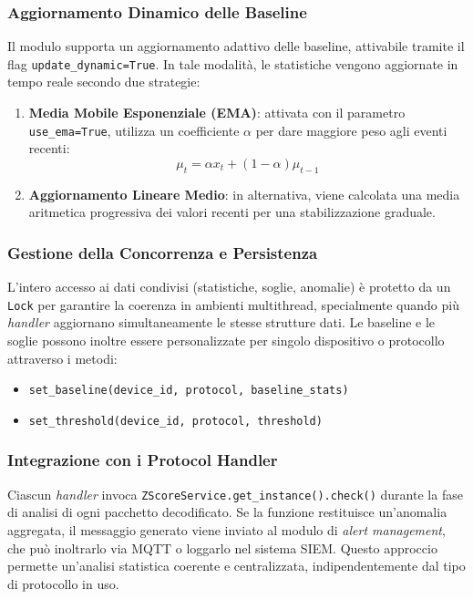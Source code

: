 \begin{enumerate}
\subsubsection{Aggiornamento Dinamico delle Baseline}
Il modulo supporta un aggiornamento adattivo delle baseline, attivabile tramite il flag \texttt{update\_dynamic=True}.  
In tale modalità, le statistiche vengono aggiornate in tempo reale secondo due strategie:
\begin{enumerate}
  \item \textbf{Media Mobile Esponenziale (EMA)}: attivata con il parametro \texttt{use\_ema=True}, utilizza un coefficiente \(\alpha\) per dare maggiore peso agli eventi recenti:
  \[
  \mu_{t} = \alpha x_{t} + (1 - \alpha) \mu_{t-1}
  \]
  \item \textbf{Aggiornamento Lineare Medio}: in alternativa, viene calcolata una media aritmetica progressiva dei valori recenti per una stabilizzazione graduale.
\end{enumerate}

\subsubsection{Gestione della Concorrenza e Persistenza}
L’intero accesso ai dati condivisi (statistiche, soglie, anomalie) è protetto da un \texttt{Lock} per garantire la coerenza in ambienti multithread, specialmente quando più \textit{handler} aggiornano simultaneamente le stesse strutture dati.  
Le baseline e le soglie possono inoltre essere personalizzate per singolo dispositivo o protocollo attraverso i metodi:
\begin{itemize}
  \item \texttt{set\_baseline(device\_id, protocol, baseline\_stats)}
  \item \texttt{set\_threshold(device\_id, protocol, threshold)}
\end{itemize}

\subsubsection{Integrazione con i Protocol Handler}
Ciascun \textit{handler} invoca \texttt{ZScoreService.get\_instance().check()} durante la fase di analisi di ogni pacchetto decodificato.  
Se la funzione restituisce un’anomalia aggregata, il messaggio generato viene inviato al modulo di \textit{alert management}, che può inoltrarlo via MQTT o loggarlo nel sistema SIEM.  
Questo approccio permette un’analisi statistica coerente e centralizzata, indipendentemente dal tipo di protocollo in uso.


\end{enumerate}
